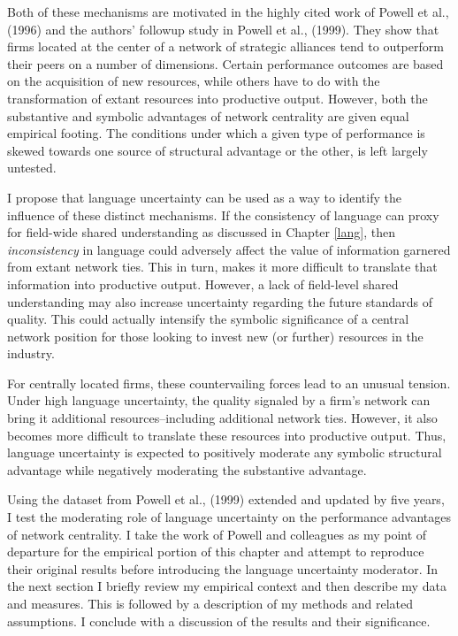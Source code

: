Both of these mechanisms are motivated in the highly cited work of Powell et al., (1996) and the authors' followup study in Powell et al., (1999). They show that firms located at the center of a network of strategic alliances tend to outperform their peers on a number of dimensions. Certain performance outcomes are based on the acquisition of new resources, while others have to do with the transformation of extant resources into productive output. However, both the substantive and symbolic advantages of network centrality are given equal empirical footing. The conditions under which a given type of performance is skewed towards one source of structural advantage or the other, is left largely untested. 

I propose that language uncertainty can be used as a way to identify the influence of these distinct mechanisms. If the consistency of language can proxy for field-wide shared understanding as discussed in Chapter \ref{lang}, then \emph{inconsistency} in language could adversely affect the value of information garnered from extant network ties. This in turn, makes it more difficult to translate that information into productive output. However, a lack of field-level shared understanding may also increase uncertainty regarding the future standards of quality. This could actually intensify the symbolic significance of a central network position for those looking to invest new (or further) resources in the industry. 

For centrally located firms, these countervailing forces lead to an unusual tension. Under high language uncertainty, the quality signaled by a firm's network can bring it additional resources--including additional network ties. However, it also becomes more difficult to translate these resources into productive output. Thus, language uncertainty is expected to positively moderate any symbolic structural advantage while negatively moderating the substantive advantage.

Using the dataset from Powell et al., (1999) extended and updated by five years, I test the moderating role of language uncertainty on the performance advantages of network centrality. I take the work of Powell and colleagues as my point of departure for the empirical portion of this chapter and attempt to reproduce their original results before introducing the language uncertainty moderator. In the next section I briefly review my empirical context and then describe my data and measures. This is followed by a description of my methods and related assumptions. I conclude with a discussion of the results and their significance.

